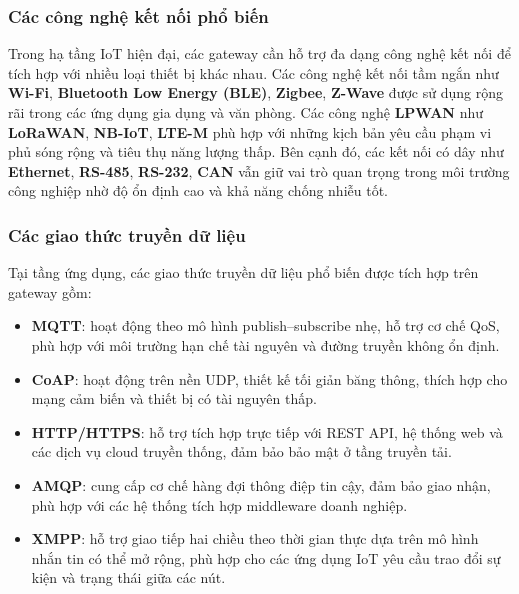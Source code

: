         \subsubsection{Các công nghệ kết nối phổ biến}
            Trong hạ tầng IoT hiện đại, các gateway cần hỗ trợ đa dạng công nghệ kết nối để tích hợp với nhiều loại thiết bị khác nhau. Các công nghệ kết nối tầm ngắn như \textbf{Wi-Fi}, \textbf{Bluetooth Low Energy (BLE)}, \textbf{Zigbee}, \textbf{Z-Wave} được sử dụng rộng rãi trong các ứng dụng gia dụng và văn phòng. Các công nghệ \textbf{LPWAN} như \textbf{LoRaWAN}, \textbf{NB-IoT}, \textbf{LTE-M} phù hợp với những kịch bản yêu cầu phạm vi phủ sóng rộng và tiêu thụ năng lượng thấp. Bên cạnh đó, các kết nối có dây như \textbf{Ethernet}, \textbf{RS-485}, \textbf{RS-232}, \textbf{CAN} vẫn giữ vai trò quan trọng trong môi trường công nghiệp nhờ độ ổn định cao và khả năng chống nhiễu tốt.
    
        \subsubsection{Các giao thức truyền dữ liệu}
            Tại tầng ứng dụng, các giao thức truyền dữ liệu phổ biến được tích hợp trên gateway gồm:
            \begin{itemize}
                \item \textbf{MQTT}: hoạt động theo mô hình publish--subscribe nhẹ, hỗ trợ cơ chế QoS, phù hợp với môi trường hạn chế tài nguyên và đường truyền không ổn định.
                \item \textbf{CoAP}: hoạt động trên nền UDP, thiết kế tối giản băng thông, thích hợp cho mạng cảm biến và thiết bị có tài nguyên thấp.
                \item \textbf{HTTP/HTTPS}: hỗ trợ tích hợp trực tiếp với REST API, hệ thống web và các dịch vụ cloud truyền thống, đảm bảo bảo mật ở tầng truyền tải.
                \item \textbf{AMQP}: cung cấp cơ chế hàng đợi thông điệp tin cậy, đảm bảo giao nhận, phù hợp với các hệ thống tích hợp middleware doanh nghiệp.
                \item \textbf{XMPP}: hỗ trợ giao tiếp hai chiều theo thời gian thực dựa trên mô hình nhắn tin có thể mở rộng, phù hợp cho các ứng dụng IoT yêu cầu trao đổi sự kiện và trạng thái giữa các nút.
            \end{itemize}
    
